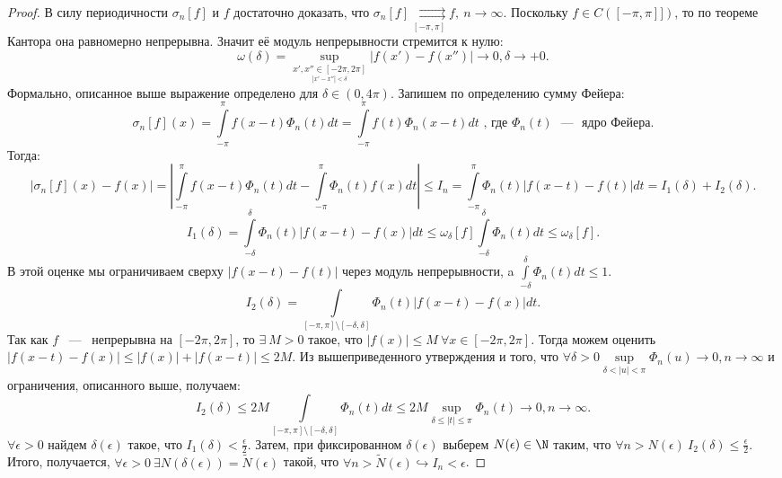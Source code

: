 \begin{proof}
    В силу периодичности $\sigma_n[f]$ и $f$ достаточно доказать, что $\sigma_n[f] \underset{[-\pi, \pi]}{\rightrightarrows} f, \ n \rightarrow \infty$. 
    Поскольку $f \in C([-\pi, \pi]])$, то по теореме Кантора она равномерно непрерывна. Значит её модуль непрерывности стремится к нулю: 
    $$
    \omega(\delta) = \sup\limits_{\underset{|x' - x''| < \delta}{x', x'' \in [-2\pi, 2\pi]}} |f(x') - f(x'')| \rightarrow 0, \delta \rightarrow +0.
    $$
    Формально, описанное выше выражение определено для $\delta \in (0, 4\pi).$ Запишем по определению сумму Фейера: 
    $$
    \sigma_n[f](x) = \int\limits_{-\pi}^{\pi}f(x - t) \Phi_n(t) dt = \int\limits_{-\pi}^{\pi}f(t)\Phi_n(x - t) dt \text{ , где } \Phi_n(t) \text{ ~---~ ядро Фейера}.
    $$
    Тогда: 
    $$
    |\sigma_n[f](x) - f(x)| = \left| \int\limits_{-\pi}^{\pi} f(x - t)\Phi_n(t)dt - \int\limits_{-\pi}^{\pi} \Phi_n(t) f(x) dt \right| \le I_n = \int\limits_{-\pi}^{\pi} \Phi_n(t) |f(x - t) - f(t)| dt = I_1(\delta) + I_2(\delta).
    $$
    $$
    I_1(\delta) = \int\limits_{-\delta}^{\delta}\Phi_n(t) |f(x - t) - f(x)| dt \le \omega_{\delta}[f] \int\limits_{-\delta}^{\delta} \Phi_n(t) dt \le \omega_{\delta}[f].
    $$
    В этой оценке мы ограничиваем сверху $|f(x - t) - f(t)|$ через модуль непрерывности, \newline  a $\int\limits_{-\delta}^{\delta} \Phi_n(t) dt \le 1$.
    $$
    I_2(\delta) = \int\limits_{[-\pi, \pi] \setminus [-\delta, \delta]} \Phi_n(t) |f(x - t) - f(x)| dt.
    $$
    Так как $f$ ~---~ непрерывна на $[-2\pi, 2\pi]$, то $\exists \ M > 0$ такое, что $|f(x)| \le M \ \forall x \in [-2\pi, 2\pi]$. Тогда можем оценить $|f(x - t) - f(x)| \le |f(x)| + |f(x - t)| \le 2M$. \newline
    Из вышеприведенного утверждения и того, что $\forall \delta > 0 \sup\limits_{\delta < |u| < \pi} \Phi_n(u) \rightarrow 0, n \rightarrow \infty$ и ограничения, описанного выше, получаем: 
    $$
    I_2(\delta) \le 2M \int\limits_{[-\pi, \pi] \setminus [-\delta, \delta]} \Phi_n(t) dt \le 2M \sup\limits_{\delta \le |t| \le \pi} \Phi_n(t) \rightarrow 0, n \rightarrow \infty.
    $$
    $\forall \epsilon > 0$ найдем $\delta(\epsilon)$ такое, что $I_1(\delta) < \frac{\epsilon}{2}$. Затем, при фиксированном $\delta(\epsilon)$ выберем $N(\epsilon) \in \N$ таким, что $\forall n > N(\epsilon) \ I_2(\delta) \le \frac{\epsilon}{2}$. \newline 
    Итого, получается, $\forall \epsilon > 0 \ \exists N(\delta(\epsilon)) = \tilde{N}(\epsilon)$ такой, что $\forall n > \tilde{N}(\epsilon) \hookrightarrow I_n < \epsilon$.
\end{proof}

